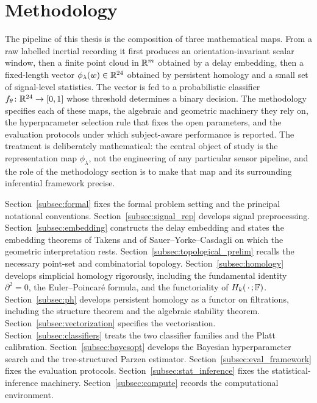 \chapter{Methodology}
\label{sec:methodology}

The pipeline of this thesis is the composition of three mathematical maps. From a raw labelled inertial recording it first produces an orientation-invariant scalar window, then a finite point cloud in $\mathbb{R}^m$ obtained by a delay embedding, then a fixed-length vector $\phi_\lambda(w)\in\mathbb{R}^{24}$ obtained by persistent homology and a small set of signal-level statistics. The vector is fed to a probabilistic classifier $f_\theta\colon\mathbb{R}^{24}\to[0,1]$ whose threshold determines a binary decision. The methodology specifies each of these maps, the algebraic and geometric machinery they rely on, the hyperparameter selection rule that fixes the open parameters, and the evaluation protocols under which subject-aware performance is reported. The treatment is deliberately mathematical: the central object of study is the representation map $\phi_\lambda$, not the engineering of any particular sensor pipeline, and the role of the methodology section is to make that map and its surrounding inferential framework precise.

Section~\ref{subsec:formal} fixes the formal problem setting and the principal notational conventions. Section~\ref{subsec:signal_rep} develops signal preprocessing. Section~\ref{subsec:embedding} constructs the delay embedding and states the embedding theorems of Takens and of Sauer--Yorke--Casdagli on which the geometric interpretation rests. Section~\ref{subsec:topological_prelim} recalls the necessary point-set and combinatorial topology. Section~\ref{subsec:homology} develops simplicial homology rigorously, including the fundamental identity $\partial^2=0$, the Euler--Poincar\'e formula, and the functoriality of $H_k(\,\cdot\,;\mathbb{F})$. Section~\ref{subsec:ph} develops persistent homology as a functor on filtrations, including the structure theorem and the algebraic stability theorem. Section~\ref{subsec:vectorization} specifies the vectorisation. Section~\ref{subsec:classifiers} treats the two classifier families and the Platt calibration. Section~\ref{subsec:bayesopt} develops the Bayesian hyperparameter search and the tree-structured Parzen estimator. Section~\ref{subsec:eval_framework} fixes the evaluation protocols. Section~\ref{subsec:stat_inference} fixes the statistical-inference machinery. Section~\ref{subsec:compute} records the computational environment.

